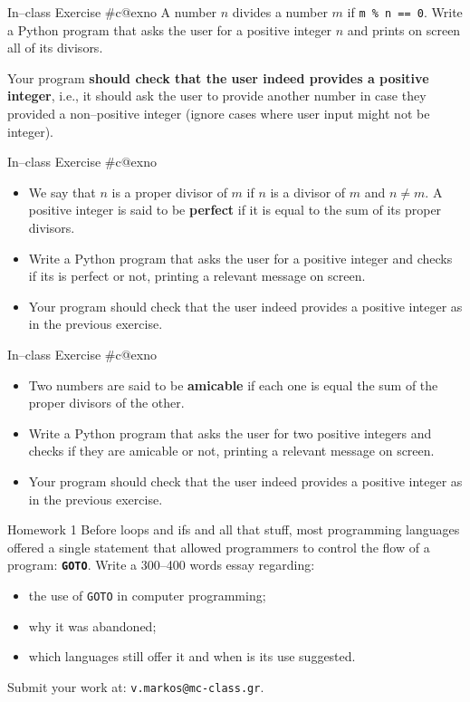 \documentclass[aspectratio=169, 12pt, xcolor=table]{beamer}
\makeatletter
\newcommand{\arabicthree}[1]{\expandafter\@arabicthree\csname c@#1\endcsname}
\newcommand{\@arabicthree}[1]{\ifnum #1<100 0\fi\ifnum #1<10 0\fi\number#1}
\newcounter{exno}
\newcommand{\exno}{\stepcounter{exno}In--class Exercise \#\arabicthree{exno}}
\makeatother
\begin{document}
	\begin{frame}{\exno}
		A number $n$ divides a number $m$ if \texttt{m \% n == 0}. Write a Python program that asks the user for a positive integer $n$ and prints on screen all of its divisors.
		
		Your program \textbf{should check that the user indeed provides a positive integer}, i.e., it should ask the user to provide another number in case they provided a non--positive integer (ignore cases where user input might not be integer).
	\end{frame}

	\begin{frame}{\exno}
		\begin{itemize}
			\item We say that $n$ is a proper divisor of $m$ if $n$ is a divisor of $m$ and $n\neq m$. A positive integer is said to be \textbf{perfect} if it is equal to the sum of its proper divisors.
			\item Write a Python program that asks the user for a positive integer and checks if its is perfect or not, printing a relevant message on screen.
			\item Your program should check that the user indeed provides a positive integer as in the previous exercise.
		\end{itemize}
	\end{frame}

	\begin{frame}{\exno}
		\begin{itemize}
			\item Two numbers are said to be \textbf{amicable} if each one is equal the sum of the proper divisors of the other.
			\item Write a Python program that asks the user for two positive integers and checks if they are amicable or not, printing a relevant message on screen.
			\item Your program should check that the user indeed provides a positive integer as in the previous exercise.
		\end{itemize}
	\end{frame}
	
	\begin{frame}{Homework 1}
		Before loops and ifs and all that stuff, most programming languages offered a single statement that allowed programmers to control the flow of a program: \texttt{\textbf{GOTO}}. Write a 300--400 words essay regarding:
		\begin{itemize}
			\item the use of \texttt{GOTO} in computer programming;
			\item why it was abandoned;
			\item which languages still offer it and when is its use suggested.
		\end{itemize}
		Submit your work at: \texttt{v.markos@mc-class.gr}.
	\end{frame}
\end{document}

